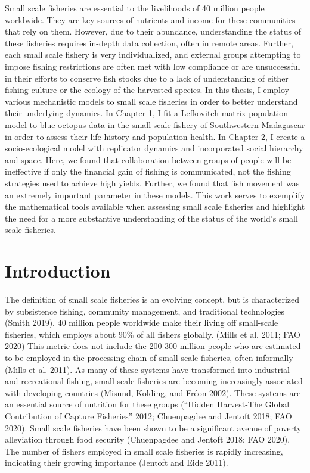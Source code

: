 \documentclass[
]{article}
\begin{document}
Small scale fisheries are essential to the livelihoods of 40 million people worldwide. They are key sources of nutrients and income for these communities that rely on them. However, due to their abundance, understanding the status of these fisheries requires in-depth data collection, often in remote areas. Further, each small scale fishery is very individualized, and external groups attempting to impose fishing restrictions are often met with low compliance or are unsuccessful in their efforts to conserve fish stocks due to a lack of understanding of either fishing culture or the ecology of the harvested species. In this thesis, I employ various mechanistic models to small scale fisheries in order to better understand their underlying dynamics. In Chapter 1, I fit a Lefkovitch matrix population model to blue octopus data in the small scale fishery of Southwestern Madagascar in order to assess their life history and population health. In Chapter 2, I create a socio-ecological model with replicator dynamics and incorporated social hierarchy and space. Here, we found that collaboration between groups of people will be ineffective if only the financial gain of fishing is communicated, not the fishing strategies used to achieve high yields. Further, we found that fish movement was an extremely important parameter in these models. This work serves to exemplify the mathematical tools available when assessing small scale fisheries and highlight the need for a more substantive understanding of the status of the world's small scale fisheries.

\newpage


\hypertarget{introduction}{%
\section{Introduction}\label{introduction}}

The definition of small scale fisheries is an evolving concept, but is characterized by subsistence fishing, community management, and traditional technologies (Smith 2019). 40 million people worldwide make their living off small-scale fisheries, which employs about 90\% of all fishers globally. (Mills et al. 2011; FAO 2020) This metric does not include the 200-300 million people who are estimated to be employed in the processing chain of small scale fisheries, often informally (Mills et al. 2011). As many of these systems have transformed into industrial and recreational fishing, small scale fisheries are becoming increasingly associated with developing countries (Misund, Kolding, and Fréon 2002). These systems are an essential source of nutrition for these groups ({``Hidden {Harvest}-{The} {Global} {Contribution} of {Capture} {Fisheries}''} 2012; Chuenpagdee and Jentoft 2018; FAO 2020). Small scale fisheries have been shown to be a significant avenue of poverty alleviation through food security (Chuenpagdee and Jentoft 2018; FAO 2020). The number of fishers employed in small scale fisheries is rapidly increasing, indicating their growing importance (Jentoft and Eide 2011).
\end{document}
